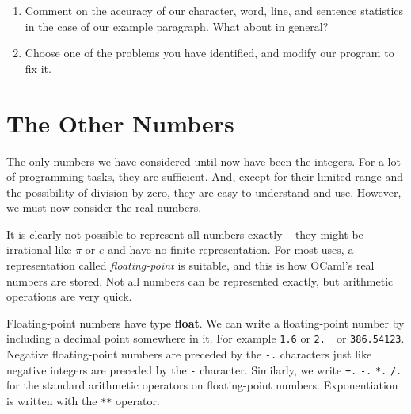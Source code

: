 \documentclass[]{book}
\begin{document}
\begin{enumerate}
  \item Comment on the accuracy of our character, word, line, and sentence statistics in the case of our example paragraph. What about in general?
  \item Choose one of the problems you have identified, and modify our program to fix it.
  
\end{enumerate}

\cleardoublepage
\thispagestyle{empty}

\pagestyle{empty}


\chapter{The Other Numbers}
\pagestyle{fancy}

The only numbers we have considered until now have been the integers. For a lot of programming tasks, they are sufficient. And, except for their limited range and the possibility of division by zero, they are easy to understand and use. However, we must now consider the real numbers.

It is clearly not possible to represent all numbers exactly -- they might be irrational like $\pi$ or $e$ and have no finite representation. For most uses, a representation called \textit{floating-point} is suitable, and this is how OCaml's real numbers are stored. Not all numbers can be represented exactly, but arithmetic operations are very quick.

Floating-point numbers have type \textbf{\textsf{float}}. We can write a floating-point number by including a decimal point somewhere in it. For example \verb!1.6! or \verb!2.!\ \ or \texttt{386.54123}. Negative floating-point numbers are preceded by the \verb!-.! characters just like negative integers are preceded by the \verb!-! character. Similarly, we write \verb!+.! \verb!-.! \verb!*.! \verb!/.! for the standard arithmetic operators on floating-point numbers. Exponentiation is written with the \verb!**! operator.
\end{document}
